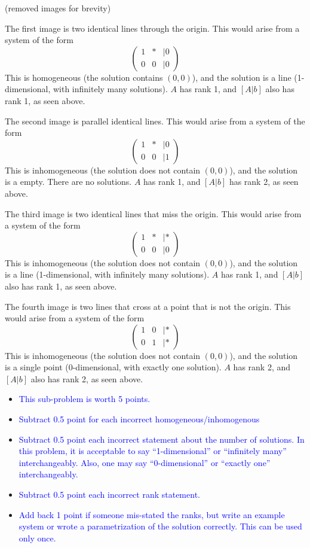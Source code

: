 \documentclass[10pt,twoside]{article}
\begin{document}
(removed images for brevity)

The first image is two identical lines through the origin.
This would arise from a system of the form 
\[\begin{pmatrix} 1 & * &|0 \\ 0 & 0 &|0 \end{pmatrix}\]
This is homogeneous (the solution contains $(0,0)$), and the solution is a line
(1-dimensional, with infinitely many solutions).  $A$ has rank 1, and $[A|b]$
also has rank 1, as seen above.

The second image is parallel identical lines. 
This would arise from a system of the form 
\[\begin{pmatrix} 1 & * &|0 \\ 0 & 0 & |1 \end{pmatrix}\]
This is inhomogeneous (the solution does not contain $(0,0)$), and the solution
is a empty.  There are no solutions.
$A$ has rank 1, and $[A|b]$
has rank 2, as seen above.

The third image is two identical lines that miss the origin.
This would arise from a system of the form 
\[\begin{pmatrix} 1 & * &|* \\ 0 & 0 & |0 \end{pmatrix}\]
This is inhomogeneous (the solution does not contain $(0,0)$), and the solution
is a line (1-dimensional, with infinitely many solutions). 
$A$ has rank 1, and $[A|b]$
also has rank 1, as seen above.

The fourth image is two lines that cross at a point that is not the origin.
This would arise from a system of the form 
\[\begin{pmatrix} 1 & 0 &|* \\ 0 & 1 & |* \end{pmatrix}\]
This is inhomogeneous (the solution does not contain $(0,0)$), and the solution
is a single point (0-dimensional, with exactly one solution).
$A$ has rank 2, and $[A|b]$
also has rank 2, as seen above.


\begin{itemize}
\item\textcolor{blue}{This sub-problem is worth 5 points.}
\item\textcolor{blue}{Subtract 0.5 point for each incorrect
homogeneous/inhomogenous}
\item\textcolor{blue}{Subtract 0.5 point each incorrect statement about the
number of solutions.  In this problem, it is acceptable to say
``1-dimensional'' or ``infinitely many'' interchangeably.  Also, one may say
``0-dimensional'' or ``exactly one'' interchangeably.}
\item\textcolor{blue}{Subtract 0.5 point each incorrect rank statement.}
\item\textcolor{blue}{Add back 1 point if someone mis-stated the ranks, but
write an example system or wrote a parametrization of the solution correctly.
This can be used only once.}
\end{itemize}




\end{document}
